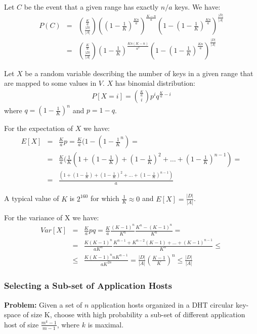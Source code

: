 \documentclass[11pt,twocolumn]{MyTightStyle}
\theoremstyle{plain}
\theoremstyle{definition}
\theoremstyle{remark}
\numberwithin{equation}{section}
\begin{document}
Let $C$ be the event that a given range has exactly $n/a$ keys. We
have:
\begin{eqnarray*}
P(C) &=& {{\frac{K}{a}} \choose
  {\frac{|D|}{|A|}}}
  ((1-\frac{1}{K})^\frac{Kn}{a})^\frac{K-n}{a}(1-(1-\frac{1}{K})^\frac{Kn}{a})^\frac{|D|}{|A|}\\
&=&  {{\frac{K}{a}} \choose
  {\frac{|D|}{|A|}}}(1-\frac{1}{K})^\frac{Kn(K-n)}{a^2}(1-(1-\frac{1}{K})^\frac{Kn}{a})^\frac{|D|}{|A|}
\end{eqnarray*}


Let $X$ be a random variable describing the number of keys in a given
range that are mapped to some values in $V$. $X$ has binomial
distribution:
\begin{eqnarray*}
P[X=i] = {\frac{K}{a} \choose i}p^iq^{\frac{K}{a}-i}
\end{eqnarray*}
where $q = (1-\frac{1}{K})^n$ and $p=1-q$.

For the expectation of $X$ we have:
\begin{eqnarray*}
E[X] &=& \frac{K}{a}p = \frac{K}{a}(1-(1-\frac{1}{K}^n) =\\
&=& \frac{K}{a}(\frac{1}{K}(1+(1-\frac{1}{K}) + (1-\frac{1}{K})^2 +
\ldots + (1-\frac{1}{K})^{n-1})=\\
&=& \frac{(1+(1-\frac{1}{K}) + (1-\frac{1}{K})^2 +
\ldots + (1-\frac{1}{K})^{n-1})}{a}
\end{eqnarray*}

A typical value of $K$ is $2^{160}$ for which $\frac{1}{K} \approx 0$
and $E[X] = \frac{|D|}{|A|}$.

For the variance of X we have:
\begin{eqnarray*}
Var[X] &=& \frac{K}{a}pq = \frac{K}{a}\frac{(K-1)^n}{K^n}\frac{K^n -
  (K-1)^n}{K^n} =\\
&=& \frac{K(K-1)^n}{aK^n}\frac{K^{n-1} + K^{n-2}(K-1) + \ldots +
  (K-1)^{n-1}}{K^n} \leq \\
&\leq& \frac{K(K-1)^nnK^{n-1}}{aK^{2n}} = \frac{|D|}{|A|}(\frac{K-1}{K})^n
  \leq \frac{|D|}{|A|}
\end{eqnarray*}


\subsubsection{Selecting a Sub-set of Application Hosts}
\label{sec:selecting}
{\bf Problem:} Given a set of $n$ application hosts organized in a DHT
circular key-space of size K, choose with high probability a sub-set
of different application host of size $\frac{m^k-1}{m-1}$, where $k$
is maximal.\\
\end{document}
